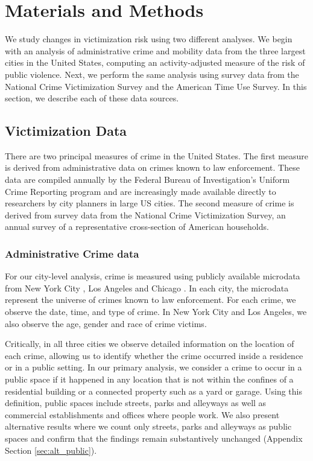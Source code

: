\documentclass[12pt]{article}
\begin{document}
\section{Materials and Methods}
We study changes in victimization risk using two different analyses. We begin with an analysis of administrative crime and mobility data from the three largest cities in the United States, computing an activity-adjusted measure of the risk of public violence. Next, we perform the same analysis using survey data from the National Crime Victimization Survey and the American Time Use Survey. In this section, we describe each of these data sources.

\subsection{Victimization Data}
There are two principal measures of crime in the United States. The first measure is derived from administrative data on crimes known to law enforcement. These data are compiled annually by the Federal Bureau of Investigation's Uniform Crime Reporting program and are increasingly made available directly to researchers by city planners in large US cities. The second measure of crime is derived from survey data from the National Crime Victimization Survey, an annual survey of a representative cross-section of American households. %

\subsubsection{Administrative Crime data}
For our city-level analysis, crime is measured using publicly available microdata from New York City \citep{nyc_crime_data}, Los Angeles \citep{la_crime_data} and Chicago \citep{chicago_crime_data}. In each city, the microdata represent the universe of crimes known to law enforcement. For each crime, we observe the date, time, and type of crime. In New York City and Los Angeles, we also observe the age, gender and race of crime victims. %

Critically, in all three cities we observe detailed information on the location of each crime, allowing us to identify whether the crime occurred inside a residence or in a public setting. In our primary analysis, we consider a crime to occur in a public space if it happened in any location that is not within the confines of a residential building or a connected property such as a yard or garage. Using this definition, public spaces include streets, parks and alleyways as well as commercial establishments and offices where people work. We also present alternative results where we count only streets, parks and alleyways as public spaces and confirm that the findings remain substantively unchanged (Appendix Section \ref{sec:alt_public}).   
\end{document}
